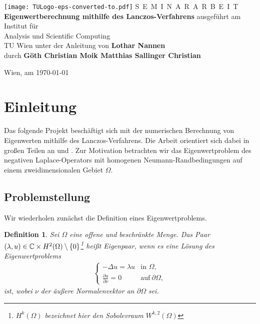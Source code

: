 \documentclass{article}
\theoremstyle{plain}
\newtheorem{definition} [theorem]{Definition}
\begin{document}
\begin{titlepage}
	\begin{center}
		\texttt{[image: TULogo-eps-converted-to.pdf]}
		\vskip 1cm%
		{\LARGE S~\Large E~M~I~N~A~R~A~R~B~E~I~T}
		\vskip 8mm
		{\huge\bfseries Eigenwertberechnung mithilfe des Lanczos-Verfahrens}
		\vskip 1cm
		\large
		ausgef\"uhrt am
		\vskip 0.75cm
		{\Large Institut f\"ur\\[1ex] Analysis und Scientific Computing}\\[1ex]
		{\Large TU Wien}
		\vskip0.75cm
		unter der Anleitung von
		\vskip0.75cm
		{\Large\bfseries Lothar Nannen}\\[1ex]
		\vskip 0.5cm
		durch
		\vskip 0.5cm
		{\Large\bfseries Göth Christian \quad Moik Matthias \quad Sallinger Christian}\\[1ex]
	\end{center}

	\vfill

	\small
	Wien, am {\today}
	\vspace*{-15mm}
\end{titlepage}

\newpage
\tableofcontents
\newpage

\pagestyle{headings}

\section{Einleitung}

Das folgende Projekt beschäftigt sich mit der numerischen Berechnung von Eigenwerten mithilfe des Lanczos-Verfahrens. Die Arbeit orientiert sich dabei in großen Teilen an \cite{EWPs} und \cite{Num}. Zur Motivation betrachten wir das Eigenwertproblem des negativen Laplace-Operators mit homogenen Neumann-Randbedingungen auf einem zweidimensionalen Gebiet $\Omega$.

\subsection{Problemstellung}

Wir wiederholen zunächst die Definition eines Eigenwertproblems.

\begin{definition}
	Sei $\Omega$ eine offene und beschränkte Menge. Das Paar $(\lambda, u) \in \mathbb{C} \times H^2(\Omega) \setminus \{0\}$\footnote{$H^k(\Omega)$ bezeichnet hier den Sobolevraum $W^{k,2}(\Omega)$} heißt Eigenpaar, wenn es eine Lösung des Eigenwertproblems
	\begin{align}
	    \begin{cases}
	    -\Delta u = \lambda u & \text{in } \Omega, \\
	    \frac{\partial u}{\partial \nu} = 0 & \text{auf}~ \partial\Omega,
	    \end{cases}
	    \label{neumann}
	\end{align}
	ist, wobei $\nu$ der äußere Normalenvektor an $\partial\Omega$ sei.
\end{definition}
\end{document}
